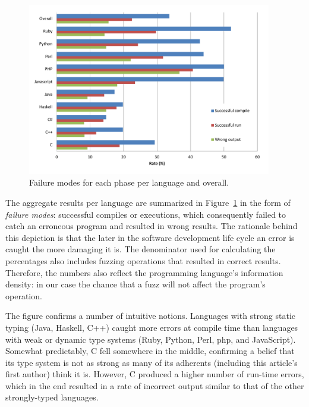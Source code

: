 \documentclass[10pt]{sigplanconf}
\begin{document}
\begin{figure}
        \begin{center}
                \includegraphics[width=0.95\textwidth]{chart}
        \end{center}
        \caption{Failure modes for each phase per language and overall.}
        \label{fig:results}
\end{figure}

The aggregate results per language are summarized in Figure~\ref{fig:results}
in the form of {\em failure modes}:
successful compiles or executions, which consequently failed to catch an
erroneous program and resulted in wrong results.
The rationale behind this depiction is that the later in the software
development life cycle an error is caught the more damaging it is.
The denominator used for calculating the percentages also includes
fuzzing operations that resulted in correct results.
Therefore, the numbers also reflect the programming language's
information density:
in our case the chance that a fuzz will not affect the program's operation.

The figure confirms a number of intuitive notions.
Languages with strong static typing (Java, Haskell, C++)
caught more errors at compile time than languages
with weak or dynamic type systems
(Ruby, Python, Perl, {\sc php}, and JavaScript).
Somewhat predictably, C fell somewhere in the middle,
confirming a belief that its type system is not as strong
as many of its adherents (including this article's first author)
think it is.
However, C produced a higher number of run-time errors,
which in the end resulted in a rate of incorrect output
similar to that of the other strongly-typed languages.
\end{document}
